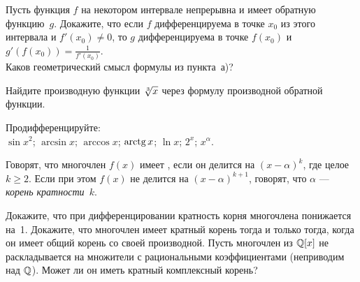 \documentclass[a4paper, 12pt]{article}
\begin{document}

 Пусть функция $f$ на некотором
интервале непрерывна и имеет обратную функцию~$g$. Докажите, что если $f$
дифференцируема в точке $x_0$ из этого интервала и $f'(x_0)\ne 0$, то %
$g$ дифференцируема в точке $f(x_0)$ и $g'(f(x_0))=\frac{1}{f'(x_0)}$.\\
 Каков геометрический смысл формулы из пункта~а)?

Найдите производную функции $\root 3 \of x$ через формулу производной обратной функции.


 Продифференцируйте:\\
 $\sin x^2$;
 $\arcsin x$;
 $\arccos x$;
 $\arctg x$;
 $\ln x$;
 $2^x$;
 $x^\alpha$.

Говорят, что многочлен $f(x)$ имеет , если он делится на $(x-\alpha)^k$, где целое $k\geq2$.
Если при этом $f(x)$ не делится на $(x-\alpha)^{k+1}$, говорят, что $\alpha$ --- {\em корень кратности~$k$}.

 Докажите, что
при дифференцировании кратность корня многочлена
понижается на~1.
Докажите, что многочлен имеет кратный
корень тогда и только
тогда, когда он имеет общий
корень со своей производной.
Пусть многочлен из $\mathbb{Q}[x]$ не раскладывается на множители с рациональными коэффициентами (неприводим над $\mathbb{Q}$). Может ли он
иметь кратный комплексный корень?




\end{document}
